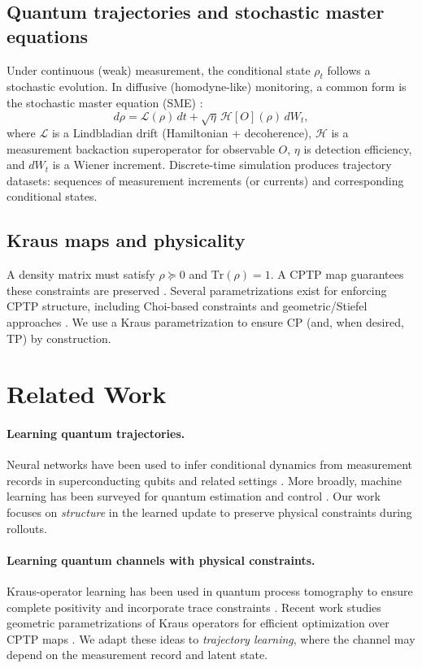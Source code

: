 \documentclass{article} %
\providecommand{\Tr}{\mathrm{Tr}}
\providecommand{\cH}{\mathcal{H}}
\providecommand{\cL}{\mathcal{L}}
\providecommand{\rh}{\rho}
\begin{document}
\subsection{Quantum trajectories and stochastic master equations}
Under continuous (weak) measurement, the conditional state $\rh_t$ follows a stochastic evolution.
In diffusive (homodyne-like) monitoring, a common form is the stochastic master equation (SME) \citep{jacobs2006straightforward,rouchon2022tutorial}:
\begin{equation}
d\rh = \cL(\rh)\, dt + \sqrt{\eta}\,\cH[O](\rh)\, dW_t,
\label{eq:sme_generic}
\end{equation}
where $\cL$ is a Lindbladian drift (Hamiltonian + decoherence), $\cH$ is a measurement backaction superoperator for observable $O$, $\eta$ is detection efficiency, and $dW_t$ is a Wiener increment.
Discrete-time simulation produces trajectory datasets: sequences of measurement increments (or currents) and corresponding conditional states.

\subsection{Kraus maps and physicality}
A density matrix must satisfy $\rh \succeq 0$ and $\Tr(\rh)=1$.
A CPTP map guarantees these constraints are preserved \citep{kraus1983states,nielsen2010quantum}.
Several parametrizations exist for enforcing CPTP structure, including Choi-based constraints and geometric/Stiefel approaches \citep{ahmed2023gdqpt,ateeq2025geometric}.
We use a Kraus parametrization to ensure CP (and, when desired, TP) by construction.

\section{Related Work}
\paragraph{Learning quantum trajectories.}
Neural networks have been used to infer conditional dynamics from measurement records in superconducting qubits and related settings \citep{flurin2020rnn}.
More broadly, machine learning has been surveyed for quantum estimation and control \citep{ma2025mlreview}.
Our work focuses on \emph{structure} in the learned update to preserve physical constraints during rollouts.

\paragraph{Learning quantum channels with physical constraints.}
Kraus-operator learning has been used in quantum process tomography to ensure complete positivity and incorporate trace constraints \citep{ahmed2023gdqpt}.
Recent work studies geometric parametrizations of Kraus operators for efficient optimization over CPTP maps \citep{ateeq2025geometric}.
We adapt these ideas to \emph{trajectory learning}, where the channel may depend on the measurement record and latent state.
\end{document}
